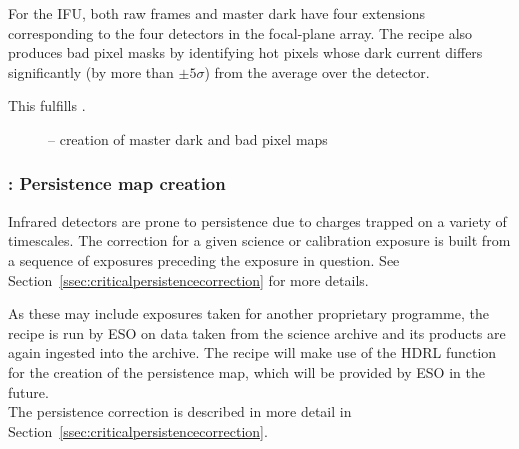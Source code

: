 For the
IFU, both raw frames and master dark have four extensions
corresponding to the four detectors in the focal-plane array. The
recipe also produces bad pixel masks by identifying hot pixels whose
dark current differs significantly (by more than $\pm 5\sigma$) from
the average over the detector.

This fulfills .



\begin{figure}[hb]
  \centering
        \def \globalscale {0.700000}
        \fontsize{10}{12}\selectfont
        
  \caption[Recipe: ]{ -- creation of master
    dark and bad pixel maps}
  \label{Fig:rec_det_dark}
\end{figure}
\clearpage
\subsubsection{: Persistence map creation}
\label{sssec:metis_det_persistence}
\label{rec:metis_det_persistence}

Infrared detectors are prone to persistence due to charges trapped on a variety of timescales. The correction for a given science or
calibration exposure is built from a sequence of exposures preceding the exposure in question.
See Section~\ref{ssec:criticalpersistencecorrection} for more details.

As these may include exposures taken for another proprietary programme, the recipe is run by ESO on data taken from the science archive and its products are again ingested into the archive. The recipe will make use of the \ac{HDRL} function for the creation of the persistence map, which will be provided by \ac{ESO} in the future.\\

The persistence correction is described in more detail in Section~\ref{ssec:criticalpersistencecorrection}.

